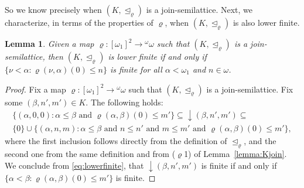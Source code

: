 \documentclass[]{amsart}
\newtheorem{lemma}[theorem]{Lemma}
\theoremstyle{definition}
\theoremstyle{remark}
\begin{document}
So we know precisely when $(K, \trianglelefteq_\varrho)$ is a join-semilattice. Next, we characterize, in terms of the properties of $\varrho$, when $(K, \trianglelefteq_\varrho)$ is also lower finite.

\begin{lemma}\label{lemma:Klowerfinite}
Given a map $\varrho:[\omega_1]^2 \rightarrow {}^\omega \omega$ such that $(K, \trianglelefteq_\varrho)$ is a join-semilattice, then  $(K, \trianglelefteq_\varrho)$ is lower finite if and only if $\{\nu < \alpha : \varrho(\nu, \alpha)(0) \le n\}$ is finite for all $\alpha < \omega_1$ and $n\in\omega$.
\end{lemma}
\begin{proof}
Fix a map $\varrho:[\omega_1]^2 \rightarrow {}^\omega \omega$ such that $(K, \trianglelefteq_\varrho)$ is a join-semilattice. Fix some $(\beta, n', m') \in K$. The following holds:
\begin{multline}\label{eq:lowerfinite}
\{(\alpha, 0, 0) : \alpha \le \beta \text{ and }\varrho(\alpha, \beta)(0) \le m'\} \subseteq {\downarrow} (\beta, n', m')\subseteq \\ \{0\} \cup \{(\alpha, n, m) : \alpha \le \beta \text{ and } n \le n' \text{ and } m\le m' \text{ and } \varrho(\alpha, \beta)(0) \le m'\},
\end{multline}
where the first inclusion follows directly from the definition of $\trianglelefteq_\varrho$, and the second one from the same definition and from ($\varrho$1) of Lemma~\ref{lemma:Kjoin}. We conclude from \eqref{eq:lowerfinite}, that ${\downarrow} (\beta, n', m')$ is finite if and only if $\{\alpha < \beta: \varrho(\alpha, \beta)(0) \le m'\}$ is finite.
\end{proof}
\end{document}
